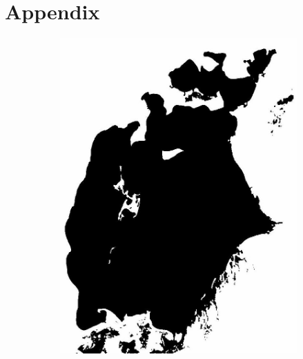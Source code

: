 \documentclass[12pt,a4paper]{article}
\begin{document}
\section{Appendix}
\begin{figure}
    \centering
    \begin{subfigure}[b]{0.19\textwidth}
        \centering
        \includegraphics[width=\textwidth]{../img/1977w.jpg}
    \end{subfigure}
    \begin{subfigure}[b]{0.19\textwidth}
        \centering

\end{subfigure}
\end{figure}
\end{document}
